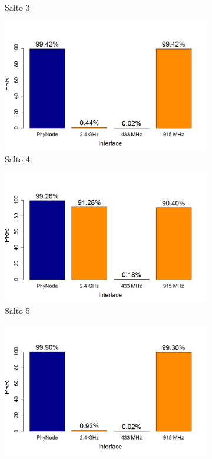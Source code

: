 \documentclass[
	12pt,				%
	openright,			%
	oneside,
	a4paper,			%
	english,			%
	french,				%
	spanish,			%
	brazil				%
	]{abntex2}
\begin{document}
\begin{figure}[htb]
\begin{subfigure}{.5\textwidth}
		\captionsetup{width=.9\textwidth}
		\caption{Salto 3}
		\label{prr_opt_s3}
	\end{subfigure}%
	\begin{subfigure}{.5\textwidth}
		\centering
		\includegraphics[width=.98\linewidth]{PRR_OPT_Salto4}
		\captionsetup{width=.9\textwidth}
		\caption{Salto 4}
		\label{prr_opt_s4}
	\end{subfigure}
	\begin{subfigure}{.5\textwidth}
		\centering
		\includegraphics[width=.98\linewidth]{PRR_OPT_Salto5}
		\captionsetup{width=.9\textwidth}
		\caption{Salto 5}
		\label{prr_opt_s5}
	\end{subfigure}%
	\begin{subfigure}{.5\textwidth}
		\centering
		\includegraphics[width=.98\linewidth]{PRR_OPT_Salto6}

\end{subfigure}
\end{figure}
\end{document}
